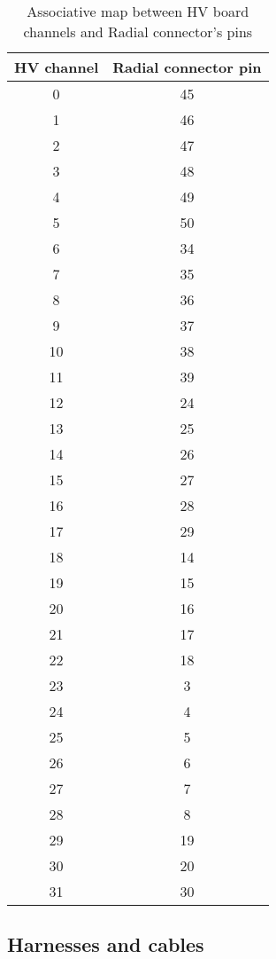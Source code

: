 \begin{table}[h!]
\begin{center}
  \begin{tabular}{|c|c|}
    \hline
    HV channel & Radial connector pin \\
    \hline
    \hline
    0 & 45  \\
    1 & 46  \\
    2 & 47  \\
    3 & 48  \\
    4 & 49  \\
    5 & 50  \\
    6 & 34  \\
    7 & 35  \\
    8 & 36  \\
    9 & 37  \\
    10 & 38   \\
    11 & 39  \\
    12 & 24  \\
    13 & 25  \\
    14 & 26  \\
    15 & 27  \\
    16 & 28  \\
    17 & 29  \\
    18 & 14  \\
    19 & 15  \\
    20 & 16  \\
    21 & 17  \\
    22 & 18  \\
    23 & 3  \\
    24 & 4  \\
    25 & 5  \\
    26 & 6  \\
    27 & 7  \\
    28 & 8  \\
    29 & 19  \\
    30 & 20  \\
    31 & 30  \\
   \hline
    \end{tabular}
  \caption{Associative map between HV board channels and 
    Radial connector's pins}\label{calohv:channel_pin_map}
\end{center}
\end{table}


\subsection{Harnesses and cables}

